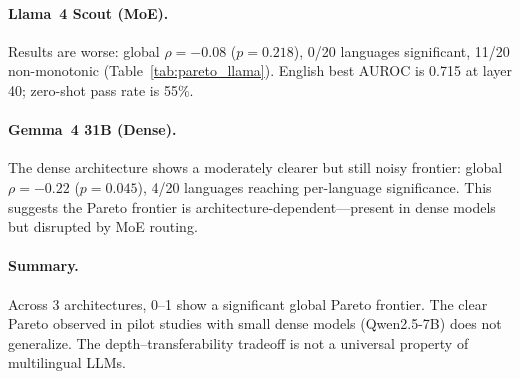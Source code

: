 \documentclass[11pt,a4paper]{article}
\newcommand{\auroc}{AUROC}
\begin{document}
\paragraph{Llama~4 Scout (MoE).}
Results are worse: global $\rho = -0.08$ ($p = 0.218$), 0/20 languages significant, 11/20 non-monotonic (Table~\ref{tab:pareto_llama}).
English best \auroc{} is 0.715 at layer 40; zero-shot pass rate is 55\%.

\paragraph{Gemma~4 31B (Dense).}
The dense architecture shows a moderately clearer but still noisy frontier: global $\rho = -0.22$ ($p = 0.045$), 4/20 languages reaching per-language significance.
This suggests the Pareto frontier is architecture-dependent---present in dense models but disrupted by MoE routing.

\paragraph{Summary.}
Across 3 architectures, 0--1 show a significant global Pareto frontier.
The clear Pareto observed in pilot studies with small dense models (Qwen2.5-7B) does not generalize.
The depth--transferability tradeoff is not a universal property of multilingual LLMs.
\end{document}
